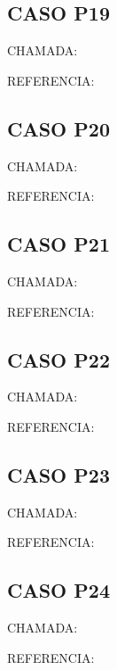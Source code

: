 \documentclass{undftex}
\begin{document}
\begin{refsection}\section*{CASO P19}\noindent CHAMADA: \par\noindent REFERENCIA:\par\printbibliography[heading=none]\end{refsection}\clearpage
\begin{refsection}\section*{CASO P20}\noindent CHAMADA: \par\noindent REFERENCIA:\par\printbibliography[heading=none]\end{refsection}\clearpage
\begin{refsection}\section*{CASO P21}\noindent CHAMADA: \par\noindent REFERENCIA:\par\printbibliography[heading=none]\end{refsection}\clearpage
\begin{refsection}\section*{CASO P22}\noindent CHAMADA: \par\noindent REFERENCIA:\par\printbibliography[heading=none]\end{refsection}\clearpage
\begin{refsection}\section*{CASO P23}\noindent CHAMADA: \par\noindent REFERENCIA:\par\printbibliography[heading=none]\end{refsection}\clearpage
\begin{refsection}\section*{CASO P24}\noindent CHAMADA: \par\noindent REFERENCIA:\par{}\end{refsection}\clearpage
\end{document}
